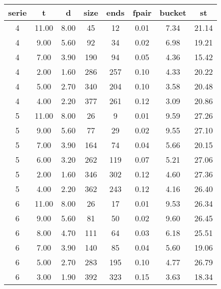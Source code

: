\begin{tabular}{|c|c|c|c|c|c|c|c|}
\hline
\textbf{serie} & \textbf{t} & \textbf{d} & \textbf{size} & \textbf{ends} & \textbf{fpair} & \textbf{bucket} & \textbf{st}\\
\hline
4 & 11.00 & 8.00 & 45 & 12 & 0.01 & 7.34 & 21.14\\
\hline
4 & 9.00 & 5.60 & 92 & 34 & 0.02 & 6.98 & 19.21\\
\hline
4 & 7.00 & 3.90 & 190 & 94 & 0.05 & 4.36 & 15.42\\
\hline
4 & 2.00 & 1.60 & 286 & 257 & 0.10 & 4.33 & 20.22\\
\hline
4 & 5.00 & 2.70 & 340 & 204 & 0.10 & 3.58 & 20.48\\
\hline
4 & 4.00 & 2.20 & 377 & 261 & 0.12 & 3.09 & 20.86\\
\hline

5 & 11.00 & 8.00 & 26 & 9 &  0.01 & 9.59 & 27.26\\
\hline
5 & 9.00 & 5.60 & 77 & 29 & 0.02 & 9.55 & 27.10\\
\hline
5 & 7.00 & 3.90 & 164 & 74 & 0.04 & 5.66 & 20.15\\
\hline
5 & 6.00 & 3.20 & 262 & 119 & 0.07 & 5.21 & 27.06\\
\hline
5 & 2.00 & 1.60 & 346 & 302 & 0.12 & 4.60 & 27.36\\
\hline
5 & 4.00 & 2.20 & 362 & 243 & 0.12 & 4.16 & 26.40\\
\hline

6 & 11.00 & 8.00 & 26 & 17 & 0.01 & 9.53 & 26.34\\
\hline
6 & 9.00 & 5.60 & 81 & 50 & 0.02 & 9.60 & 26.45\\
\hline
6 & 8.00 & 4.70 & 111 & 64 & 0.03 & 6.18 & 25.51\\
\hline
6 & 7.00 & 3.90 & 140 & 85 & 0.04 & 5.60 & 19.06\\
\hline
6 & 5.00 & 2.70 & 283 & 195 & 0.10 & 4.77 & 26.79\\
\hline
6 & 3.00 & 1.90 & 392 & 323 & 0.15 & 3.63 & 18.34\\
\hline
\end{tabular}
